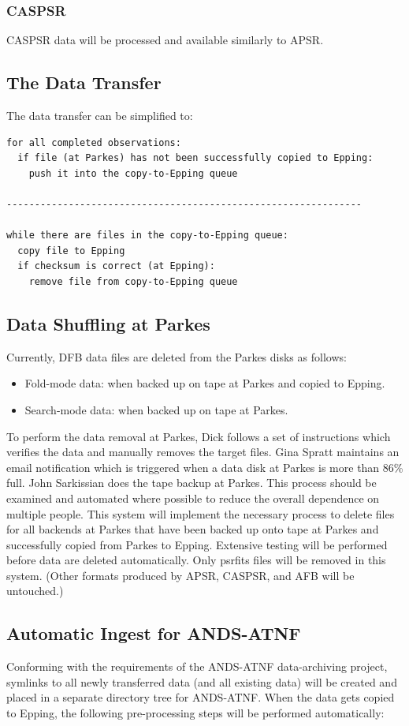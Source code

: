 \documentclass[a4paper,11pt]{article}
\begin{document}
\subsubsection{CASPSR}
CASPSR data will be processed and available similarly to APSR.

\subsection{The Data Transfer}
The data transfer can be simplified to:
\begin{verbatim}
for all completed observations: 
  if file (at Parkes) has not been successfully copied to Epping:
    push it into the copy-to-Epping queue

---------------------------------------------------------------

while there are files in the copy-to-Epping queue:
  copy file to Epping
  if checksum is correct (at Epping):
    remove file from copy-to-Epping queue
\end{verbatim}

\subsection{Data Shuffling at Parkes}
Currently, DFB data files are deleted from the Parkes disks as follows:
\begin{itemize}
\item Fold-mode data: when backed up on tape at Parkes and copied to Epping.
\item Search-mode data: when backed up on tape at Parkes.
\end{itemize}

To perform the data removal at Parkes, Dick follows a set of instructions which verifies the data and manually removes the target files. Gina Spratt maintains an email notification which is triggered when a data disk at Parkes is more than 86\% full. John Sarkissian does the tape backup at Parkes. This process should be examined and automated where possible to reduce the overall dependence on multiple people. This system will implement the necessary process to delete files for all backends at Parkes that have been backed up onto tape at Parkes and successfully copied from Parkes to Epping. Extensive testing will be performed before data are deleted automatically. Only psrfits files will be removed in this system. (Other formats produced by APSR, CASPSR, and AFB will be untouched.)

\subsection{Automatic Ingest for ANDS-ATNF}
Conforming with the requirements of the ANDS-ATNF data-archiving project, symlinks to all newly transferred data (and all existing data) will be created and placed in a separate directory tree for ANDS-ATNF. When the data gets copied to Epping, the following pre-processing steps will be performed automatically:
\end{document}
